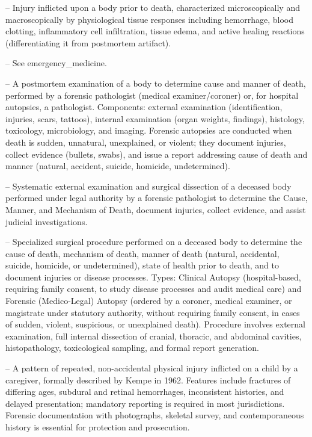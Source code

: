 -- Injury inflicted upon a body prior to death, characterized microscopically and macroscopically by physiological tissue responses including hemorrhage, blood clotting, inflammatory cell infiltration, tissue edema, and active healing reactions (differentiating it from postmortem artifact).

-- See emergency\_medicine.

-- A postmortem examination of a body to determine cause and manner of death, performed by a forensic pathologist (medical examiner/coroner) or, for hospital autopsies, a pathologist. Components: external examination (identification, injuries, scars, tattoos), internal examination (organ weights, findings), histology, toxicology, microbiology, and imaging. Forensic autopsies are conducted when death is sudden, unnatural, unexplained, or violent; they document injuries, collect evidence (bullets, swabs), and issue a report addressing cause of death and manner (natural, accident, suicide, homicide, undetermined).


-- Systematic external examination and surgical dissection of a deceased body performed under legal authority by a forensic pathologist to determine the Cause, Manner, and Mechanism of Death, document injuries, collect evidence, and assist judicial investigations.

-- Specialized surgical procedure performed on a deceased body to determine the cause of death, mechanism of death, manner of death (natural, accidental, suicide, homicide, or undetermined), state of health prior to death, and to document injuries or disease processes. Types: Clinical Autopsy (hospital-based, requiring family consent, to study disease processes and audit medical care) and Forensic (Medico-Legal) Autopsy (ordered by a coroner, medical examiner, or magistrate under statutory authority, without requiring family consent, in cases of sudden, violent, suspicious, or unexplained death). Procedure involves external examination, full internal dissection of cranial, thoracic, and abdominal cavities, histopathology, toxicological sampling, and formal report generation.

-- A pattern of repeated, non-accidental physical injury inflicted on a child by a caregiver, formally described by Kempe in 1962. Features include fractures of differing ages, subdural and retinal hemorrhages, inconsistent histories, and delayed presentation; mandatory reporting is required in most jurisdictions. Forensic documentation with photographs, skeletal survey, and contemporaneous history is essential for protection and prosecution.

